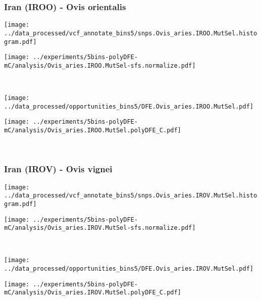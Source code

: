 \subsubsection{Iran (IROO) - Ovis orientalis}

\begin{minipage}{0.49\linewidth}
    \texttt{[image: ../data\_processed/vcf\_annotate\_bins5/snps.Ovis\_aries.IROO.MutSel.histogram.pdf]}
\end{minipage}
\begin{minipage}{0.49\linewidth}
    \texttt{[image: ../experiments/5bins-polyDFE-mC/analysis/Ovis\_aries.IROO.MutSel-sfs.normalize.pdf]}
\end{minipage}
\\
\begin{minipage}{0.49\linewidth}
    \texttt{[image: ../data\_processed/opportunities\_bins5/DFE.Ovis\_aries.IROO.MutSel.pdf]}
\end{minipage}
\begin{minipage}{0.49\linewidth}
    \texttt{[image: ../experiments/5bins-polyDFE-mC/analysis/Ovis\_aries.IROO.MutSel.polyDFE\_C.pdf]}
\end{minipage}
\\

\subsubsection{Iran (IROV) - Ovis vignei}

\begin{minipage}{0.49\linewidth}
    \texttt{[image: ../data\_processed/vcf\_annotate\_bins5/snps.Ovis\_aries.IROV.MutSel.histogram.pdf]}
\end{minipage}
\begin{minipage}{0.49\linewidth}
    \texttt{[image: ../experiments/5bins-polyDFE-mC/analysis/Ovis\_aries.IROV.MutSel-sfs.normalize.pdf]}
\end{minipage}
\\
\begin{minipage}{0.49\linewidth}
    \texttt{[image: ../data\_processed/opportunities\_bins5/DFE.Ovis\_aries.IROV.MutSel.pdf]}
\end{minipage}
\begin{minipage}{0.49\linewidth}
    \texttt{[image: ../experiments/5bins-polyDFE-mC/analysis/Ovis\_aries.IROV.MutSel.polyDFE\_C.pdf]}
\end{minipage}
\\

